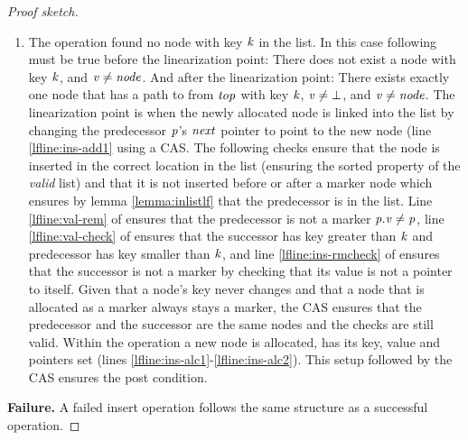 \begin{proof}[Proof sketch]
\begin{enumerate}
\item The operation found no node with key $\ms{k}$ in the list.
In this case following must be true before the linearization point:
There does not exist a node with key $\ms{k}$, and $\ms{v \neq node}$.
And after the linearization point:
There exists exactly one node that has a path to from $\ms{top}$ with key $\ms{k}$, $\ms{v} \neq \bot$, and $\ms{v \neq node}$.
The linearization point is when the newly allocated node is linked into the list
by changing the predecessor $\ms{p}$'s $\ms{next}$ pointer to point to the new node (line \ref{lfline:ins-add1} using a CAS.
The following checks ensure that the node is inserted in the correct location in the list (ensuring the sorted property of the \emph{valid} list) and that it is not inserted before or after a marker node
which ensures by lemma \ref{lemma:inlistlf} that the predecessor is in the list.
Line \ref{lfline:val-rem} of  ensures that the predecessor is not a marker $\ms{p.v \neq p}$,  line \ref{lfline:val-check} of 
ensures that the successor has key greater than $\ms{k}$ and predecessor has key smaller than $\ms{k}$,
and line \ref{lfline:ins-rmcheck} of  ensures that the successor is not a marker by checking that its value is not a pointer to itself.
Given that a node's key never changes and that a node that is allocated as a marker always stays a marker, the CAS ensures that the predecessor
and the successor are the same nodes and the checks are still valid.
Within the  operation a new node is allocated, has its key, value and pointers set (lines \ref{lfline:ins-alc1}-\ref{lfline:ins-alc2}).
This setup followed by the CAS ensures the post condition.
\end{enumerate}

{\bf Failure.} A failed insert operation follows the same structure as a
successful  operation.

\end{proof}

